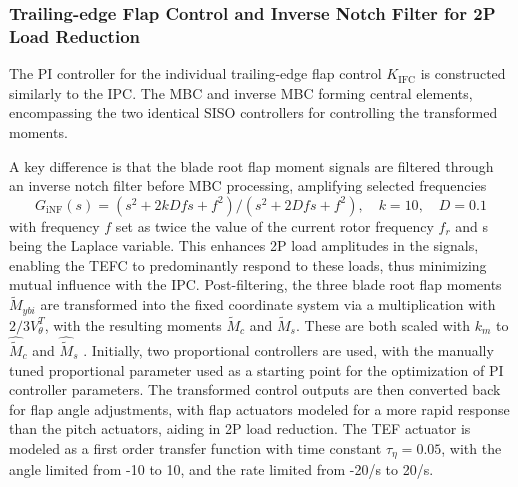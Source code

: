\subsubsection*{Trailing-edge Flap Control and Inverse Notch Filter for 2P Load Reduction}
The PI controller for the individual trailing-edge flap control $K_{\text{IFC}}$ is constructed similarly to the IPC. The MBC and inverse MBC forming central elements, encompassing the two identical SISO controllers for controlling the transformed moments.

A key difference is that the blade root flap moment signals are filtered through an inverse notch filter before MBC processing, amplifying selected frequencies
\begin{equation*} \label{eq:Ginf}
    G_{\text{iNF}}(s) = (s^2 +2kDfs +f^2)/ (s^2 +2Dfs +f^2),\quad k=10,\quad D = 0.1
\end{equation*}
with frequency $f$ set as twice the value of the current rotor frequency $f_r$ and s being the Laplace variable. This enhances 2P load amplitudes in the signals, enabling the TEFC to predominantly respond to these loads, thus minimizing mutual influence with the IPC. Post-filtering, the three blade root flap moments $\tilde{M}_{ybi}$ are transformed into the fixed coordinate system via a multiplication with $2/3 V^T_{\theta}$, with the resulting moments $\tilde{M}_{c}$ and $\tilde{M}_{s}$. These are both scaled with $k_m$ to $\hat{\tilde{M}}_c$ and $\hat{\tilde{M}}_s$ . Initially, two proportional controllers are used, with the manually tuned proportional parameter used as a starting point for the optimization of PI controller parameters. The transformed control outputs are then converted back for flap angle adjustments, with flap actuators modeled for a more rapid response than the pitch actuators, aiding in 2P load reduction. The TEF actuator is modeled as a first order transfer function with time constant $\tau_{\eta}=0.05$, with the angle limited from -10\textdegree{} to 10\textdegree{}, and the rate limited from -20\textdegree{}/s to 20\textdegree{}/s.

